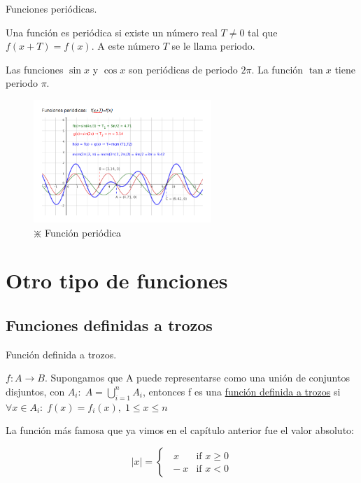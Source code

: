 		\begin{defi} Funciones periódicas.
		
		Una función es periódica	 si existe un número real $T\neq 0$ tal que $f(x+T)=f(x)$. A este número $T$ se le llama periodo.
		
		Las funciones $\sin x$ y $\cos x$ son periódicas de periodo $2\pi$. La función $\tan x$ tiene periodo $\pi$.
		\end{defi}

		\begin{figure}[H]
			\centering
			\includegraphics[width=0.6\textwidth]{imagenes/imagenes02/T02IM25.png}
			\caption{$\divideontimes$ Función periódica}
					\end{figure}
		
		\section{Otro tipo de funciones}
		
		\subsection{Funciones definidas a trozos}
		
		\begin{defi}{Función definida a trozos}.
		
		$f: A \to B$. Supongamos que A puede representarse como una unión de conjuntos disjuntos, con $A_i: \; A=\bigcup_{i=1}^{n}{{A}_{i}} $, entonces f es una \underline{función definida a trozos} si $\forall x \in A_i:\; f(x)=f_i(x),\; 1\le x \le n$
			
		\end{defi}

		
		 La función más famosa que ya vimos en el capí­tulo anterior fue el valor absoluto:
		
		\begin{equation*}
		|x|=
		\begin{cases} 
		\;\;  x &\mbox{if } x\ge 0 \\ 
		\; -x & \mbox{if } x<0 
		\end{cases}
		\end{equation*}
	
